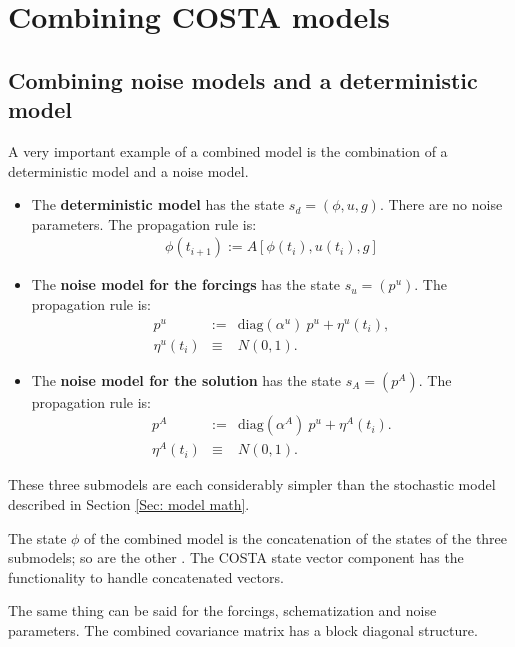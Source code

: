 \documentclass[a4paper,12pt]{article}
\begin{document}
\section{Combining COSTA models}
\subsection{Combining noise models and a deterministic model}
\label{Sec: example combi}
A very important example of a combined model is the combination of a 
deterministic model and a noise model. 
\begin{itemize}
\item The {\bf deterministic model} has the state $s_d = (\phi,u,g)$. There are
      no noise parameters.
      The propagation rule is:
\begin{eqnarray}
      \phi(t_{i+1}) := A[\phi(t_i),u(t_i),g]
\end{eqnarray}
\item The {\bf noise model for the forcings} has the state $s_u = (p^u)$. 
      The propagation rule is:
\begin{eqnarray} 
   p^u &:=& \mbox{diag}(\alpha^u) ~ p^u + \eta^u(t_i),
\nonumber \\
   \eta^u(t_i) &\equiv& N(0,1).
\end{eqnarray}
\item The {\bf noise model for the solution} has the state $s_A = (p^A)$. 
      The propagation rule is:
\begin{eqnarray} 
   p^A &:=& \mbox{diag}(\alpha^A) ~ p^u + \eta^A(t_i).
\nonumber \\
   \eta^A(t_i) &\equiv& N(0,1).
\end{eqnarray}
\end{itemize}
These three submodels are each considerably simpler than the stochastic
model described in Section \ref{Sec: model math}.

The state $\phi$ of the combined model is the concatenation of the 
states of the three submodels; so are the other . The COSTA state vector 
component has the functionality to handle concatenated vectors.

The same thing can be said for the forcings, schematization and 
noise parameters. The combined covariance matrix has a block diagonal
structure.
\end{document}
